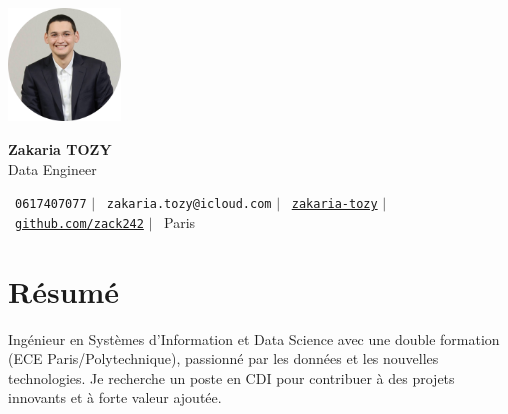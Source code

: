 \documentclass[11pt,a4paper]{article}
\begin{document}
\begin{flushleft}
  \begin{minipage}[c]{0.2\textwidth}
    \includegraphics[width=3cm]{images/profilpicture.png}
  \end{minipage}%
  \begin{minipage}[c]{0.8\textwidth}
    \hspace{10pt}
    {\huge \textbf{Zakaria TOZY}} \\ \vspace{10pt}
    \hspace{9pt}
    {\normalsize Data Engineer} \vspace{2pt}
  \end{minipage}
\end{flushleft}

\vspace{-5pt}

\begin{center}
    \small \faPhone\ \texttt{0617407077} \hspace{1pt} $|$
    \hspace{1pt} \faEnvelope\ \texttt{zakaria.tozy@icloud.com} \hspace{1pt} $|$
    \hspace{1pt} \faLinkedin\ \href{https://linkedin.com/in/zakaria-tozy}{\texttt{zakaria-tozy}} \hspace{1pt} $|$
    \hspace{1pt} \faGithub\ \href{https://github.com/zack242}{\texttt{github.com/zack242}} \hspace{1pt} $|$
    \hspace{1pt} \faMapMarker\ Paris
\end{center}

\vspace{10pt}
\section{Résumé}
Ingénieur en Systèmes d'Information et Data Science avec une double formation (ECE Paris/Polytechnique), passionné par les données et les nouvelles technologies. Je recherche un poste en CDI pour contribuer à des projets innovants et à forte valeur ajoutée.
\end{document}
